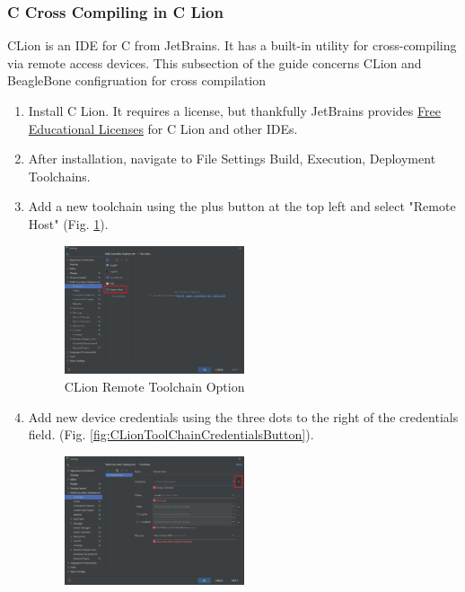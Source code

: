         \subsubsection{C Cross Compiling in C Lion}
            CLion is an IDE for C from JetBrains. It has a built-in utility for cross-compiling via remote access devices. This subsection of the guide concerns CLion and BeagleBone configruation for cross compilation
            \begin{enumerate}
                \item Install C Lion. It requires a license, but thankfully JetBrains provides  \href{https://www.jetbrains.com/community/education/#students}{Free Educational Licenses} for C Lion and other IDEs.
                \item After installation, navigate to File Settings Build, Execution, Deployment Toolchains.
                \item Add a new toolchain using the plus button at the top left and select "Remote Host" (Fig. \ref{fig:CLionToolChainRemote}).
                \begin{figure}[H]
                    \centering
                    \includegraphics[width=0.5\textwidth]{images/beagleboneblack_truckcape_v4_images/CLionToolChainRemote.png}
                    \caption{CLion Remote Toolchain Option}
                    \label{fig:CLionToolChainRemote}
                \end{figure}
                \item Add new device credentials using the three dots to the right of the credentials field. (Fig. \ref{fig:CLionToolChainCredentialsButton}).
                \begin{figure}[H]
                    \centering
                    \includegraphics[width=0.5\textwidth]{images/beagleboneblack_truckcape_v4_images/ClionToolChainCredentialsButton.png}

\end{figure}
\end{enumerate}
